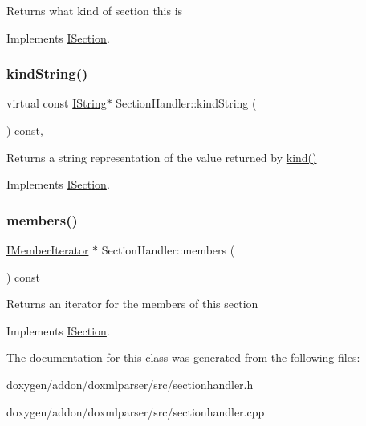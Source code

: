 Returns what kind of section this is 

Implements \mbox{\hyperlink{class_i_section_a3610cc0bc9b90608ade62b84a750ddb4}{I\+Section}}.

\mbox{\label{class_section_handler_a6f0ce72df9dc0d56ba8b20fb6684fdc9}} 
\subsubsection{\texorpdfstring{kindString()}{kindString()}}
{\footnotesize\ttfamily virtual const \mbox{\hyperlink{class_i_string}{I\+String}}$\ast$ Section\+Handler\+::kind\+String (\begin{DoxyParamCaption}{ }\end{DoxyParamCaption}) const\hspace{0.3cm}{\ttfamily [inline]}, {\ttfamily [virtual]}}

Returns a string representation of the value returned by \mbox{\hyperlink{class_section_handler_a09b0046032fbbb4189c2d5dd016475b8}{kind()}} 

Implements \mbox{\hyperlink{class_i_section_ad4027ec4d324a2ee4987f3216e225fdb}{I\+Section}}.

\mbox{\label{class_section_handler_a6e8854663f76206dfa65428e0bdc5b51}} 
\subsubsection{\texorpdfstring{members()}{members()}}
{\footnotesize\ttfamily \mbox{\hyperlink{class_i_member_iterator}{I\+Member\+Iterator}} $\ast$ Section\+Handler\+::members (\begin{DoxyParamCaption}{ }\end{DoxyParamCaption}) const\hspace{0.3cm}{\ttfamily [virtual]}}

Returns an iterator for the members of this section 

Implements \mbox{\hyperlink{class_i_section_a1980a8501eb0adbc12f00e251210c39e}{I\+Section}}.



The documentation for this class was generated from the following files\+:\begin{DoxyCompactItemize}
\item 
doxygen/addon/doxmlparser/src/sectionhandler.\+h\item 
doxygen/addon/doxmlparser/src/sectionhandler.\+cpp\end{DoxyCompactItemize}
